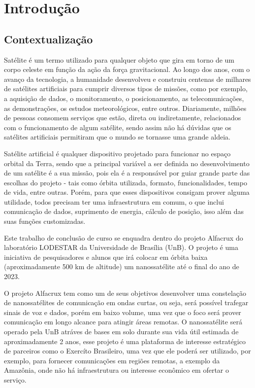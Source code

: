 \chapter{Introdução} \label{introducao}
\section{Contextualização}
Satélite é um termo utilizado para qualquer objeto que gira em torno de um corpo celeste em função da ação da força gravitacional. Ao longo dos anos, com o avanço da tecnologia, a humanidade desenvolveu e construiu centenas de milhares de satélites artificiais para cumprir diversos tipos de missões, como por exemplo, a  aquisição de dados, o monitoramento, o posicionamento, as telecomunicações, as demonstrações, os estudos meteorológicos, entre outros. Diariamente, milhões de pessoas consomem serviços que estão, direta ou indiretamente, relacionados com o funcionamento de algum satélite, sendo assim não há dúvidas que os satélites artificiais permitiram que o mundo se tornasse uma grande aldeia.

Satélite artificial é qualquer dispositivo projetado para funcionar no espaço orbital da Terra, sendo que a principal variável a ser definida no desenvolvimento de um satélite é a sua missão, pois ela é a responsável por guiar grande parte das escolhas do projeto - tais como órbita utilizada, formato, funcionalidades, tempo de vida, entre outras. Porém, para que esses dispositivos consigam prover alguma utilidade, todos precisam ter uma infraestrutura em comum, o que inclui comunicação de dados, suprimento de energia, cálculo de posição, isso além das suas funções customizadas.\cite{nasa_comms_article} 

Este trabalho de conclusão de curso se enquadra dentro do projeto Alfacrux do laboratório LODESTAR da Universidade de Brasília (UnB). O projeto é uma iniciativa de pesquisadores e alunos que irá colocar em órbita baixa (aproximadamente 500 km de altitude) um nanossatélite até o final do ano de 2023.

O projeto Alfacrux tem como um de seus objetivos desenvolver uma constelação de nanossatélites de comunicação em ondas curtas, ou seja, será possível trafegar sinais de voz e dados, porém em baixo volume, uma vez que o foco será prover comunicação em longo alcance para atingir áreas remotas. O nanossatélite será operado pela UnB atráves de bases em solo durante sua vida útil estimada de aproximadamente 2 anos, esse projeto é uma plataforma de interesse estratégico de parceiros como o Exercíto Brasileiro, uma vez que ele poderá ser utilizado, por exemplo, para fornecer comunicações em regiões remotas, a exemplo da Amazônia, onde não há infraestrutura ou interesse econômico em ofertar o serviço. 


